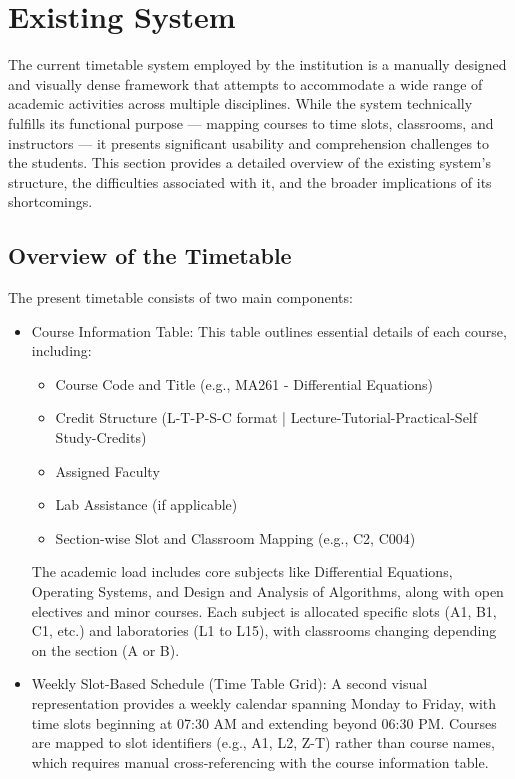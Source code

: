 \documentclass[a4paper,12pt]{article}
\begin{document}
\section{Existing System}
The current timetable system employed by the institution is a manually designed and visually dense framework that attempts to accommodate a wide range of academic activities across multiple disciplines. While the system technically fulfills its functional purpose — mapping courses to time slots, classrooms, and instructors — it presents significant usability and comprehension challenges to the students. This section provides a detailed overview of the existing system’s structure, the difficulties associated with it, and the broader implications of its shortcomings.
\newline


\subsection{Overview of the Timetable
}
The present timetable consists of two main components:
\begin{itemize}
    \item Course Information Table:
This table outlines essential details of each course, including:
\begin{itemize}
\item Course Code and Title (e.g., MA261 - Differential Equations)
\item
Credit Structure (L-T-P-S-C format | Lecture-Tutorial-Practical-Self Study-Credits)
\item Assigned Faculty
\item Lab Assistance (if applicable)
\item Section-wise Slot and Classroom Mapping (e.g., C2, C004)
\end{itemize}
The academic load includes core subjects like Differential Equations, Operating Systems, and Design and Analysis of Algorithms, along with open electives and minor courses. Each subject is allocated specific slots (A1, B1, C1, etc.) and laboratories (L1 to L15), with classrooms changing depending on the section (A or B).

\item Weekly Slot-Based Schedule (Time Table Grid):
\newline
A second visual representation provides a weekly calendar spanning Monday to Friday, with time slots beginning at 07:30 AM and extending beyond 06:30 PM. Courses are mapped to slot identifiers (e.g., A1, L2, Z-T) rather than course names, which requires manual cross-referencing with the course information table.
\end{itemize}
\end{document}

